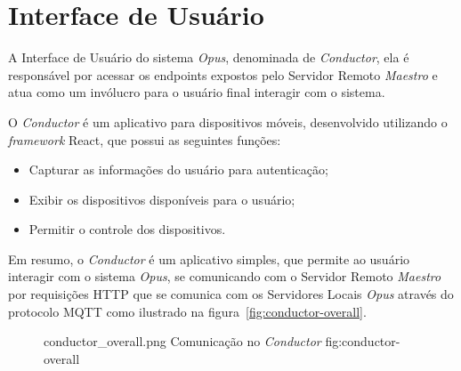 \section{\textbf{Interface de Usuário}}

A Interface de Usuário do sistema \emph{Opus}, denominada de \emph{Conductor}, ela é responsável por acessar os endpoints 
expostos pelo Servidor Remoto \emph{Maestro} e atua como um invólucro para o usuário final interagir com o sistema.

O \emph{Conductor} é um aplicativo para dispositivos móveis, desenvolvido utilizando o \emph{framework} React,
que possui as seguintes funções:
\begin{itemize}
    \item Capturar as informações do usuário para autenticação;
    \item Exibir os dispositivos disponíveis para o usuário;
    \item Permitir o controle dos dispositivos.
\end{itemize}

Em resumo, o \emph{Conductor} é um aplicativo simples, que permite ao usuário interagir com o sistema \emph{Opus}, se comunicando 
com o Servidor Remoto \emph{Maestro} por requisições HTTP que se comunica com os Servidores Locais \emph{Opus} através do protocolo MQTT
como ilustrado na figura~\ref{fig:conductor-overall}.

\begin{figure}[h!]
    {conductor_overall.png}
    {Comunicação no \emph{Conductor}}
    {fig:conductor-overall}
\end{figure}







